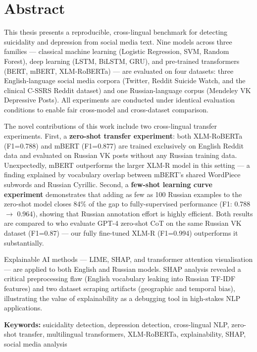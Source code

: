 \documentclass[12pt, a4paper, oneside]{report}
\begin{document}
\clearpage

\chapter*{Abstract}

This thesis presents a reproducible, cross-lingual benchmark for detecting suicidality and depression from social media text. Nine models across three families — classical machine learning (Logistic Regression, SVM, Random Forest), deep learning (LSTM, BiLSTM, GRU), and pre-trained transformers (BERT, mBERT, XLM-RoBERTa) — are evaluated on four datasets: three English-language social media corpora (Twitter, Reddit Suicide Watch, and the clinical C-SSRS Reddit dataset) and one Russian-language corpus (Mendeley VK Depressive Posts). All experiments are conducted under identical evaluation conditions to enable fair cross-model and cross-dataset comparison.

The novel contributions of this work include two cross-lingual transfer experiments. First, a \textbf{zero-shot transfer experiment}: both XLM-RoBERTa (F1=0.788) and mBERT (F1=0.877) are trained exclusively on English Reddit data and evaluated on Russian VK posts without any Russian training data. Unexpectedly, mBERT outperforms the larger XLM-R model in this setting — a finding explained by vocabulary overlap between mBERT's shared WordPiece subwords and Russian Cyrillic. Second, a \textbf{few-shot learning curve experiment} demonstrates that adding as few as 100 Russian examples to the zero-shot model closes 84\% of the gap to fully-supervised performance (F1: 0.788 $\rightarrow$ 0.964), showing that Russian annotation effort is highly efficient. Both results are compared to \citet{raihan2025} who evaluate GPT-4 zero-shot CoT on the same Russian VK dataset (F1=0.87) — our fully fine-tuned XLM-R (F1=0.994) outperforms it substantially.

Explainable AI methods — LIME, SHAP, and transformer attention visualisation — are applied to both English and Russian models. SHAP analysis revealed a critical preprocessing flaw (English vocabulary leaking into Russian TF-IDF features) and two dataset scraping artifacts (geographic and temporal bias), illustrating the value of explainability as a debugging tool in high-stakes NLP applications.

\vspace{0.5cm}
\noindent\textbf{Keywords:} suicidality detection, depression detection, cross-lingual NLP, zero-shot transfer, multilingual transformers, XLM-RoBERTa, explainability, SHAP, social media analysis
\end{document}
